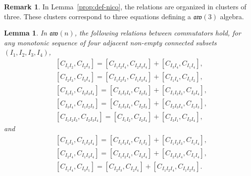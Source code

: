 \documentclass[10pt,a4paper]{amsart}
\numberwithin{equation}{section}
\newtheorem{lemm}[theo]{Lemma}
\theoremstyle{definition}
\newtheorem{rema}[theo]{Remark}
\newcommand{\aw}{\mathfrak{aw}(n)}
\begin{document}
\begin{rema}
In Lemma~\ref{prop:def-nico}, the relations are organized in clusters of three. These clusters correspond to three equations defining a $\mathfrak{aw}(3)$ algebra.
\end{rema}

\begin{lemm}\label{lem:relc1}
 In $\aw$, the following relations between commutators hold, for any monotonic sequence of four adjacent non-empty connected subsets $(I_1,I_2,I_3,I_4)$,
 \begin{align}
& [C_{I_1I_2},C_{I_2I_3} ]= [C_{I_1I_2I_4},C_{I_2I_3I_4} ]+ [C_{I_3I_4},C_{I_1I_4} ] ,
\label{eq:comut1}\\
& [C_{I_2I_3},C_{I_3I_4} ]= [C_{I_1I_2I_3},C_{I_1I_3I_4} ]+ [C_{I_1I_4},C_{I_1I_2} ] ,
\label{eq:comut2}\\
& [C_{I_1I_2} ,C_{I_2I_3I_4}]= [C_{I_1I_2I_4},C_{I_2I_3} ]+ [C_{I_1I_2I_3} ,C_{I_2I_4}] ,
\label{eq:comut3}\\
& [C_{I_3I_4} ,C_{I_1I_2I_3}]= [C_{I_1I_3I_4},C_{I_2I_3} ]+ [C_{I_2I_3I_4} ,C_{I_1I_3}] ,
\label{eq:comut4}\\
& [C_{I_1I_2I_3} ,C_{I_2I_3I_4}]= [C_{I_1I_2},C_{I_2I_4} ]+ [C_{I_3I_1} ,C_{I_3I_4}] ,
\label{eq:comut5}
 \end{align}
 and
 \begin{align}
& [C_{I_1I_3},C_{I_1I_2I_4} ]= [C_{I_1I_3I_4},C_{I_1I_2} ]+ [C_{I_1I_2I_3},C_{I_1I_4} ] ,
\label{eq:comut6}\\
& [C_{I_2I_4},C_{I_1I_3I_4} ]= [C_{I_1I_2I_4},C_{I_3I_4} ]+ [C_{I_2I_3I_4},C_{I_1I_4} ] ,
\label{eq:comut7}\\
& [C_{I_1I_4},C_{I_3I_1} ]= [C_{I_2I_3},C_{I_2I_4} ]+ [C_{I_1I_2I_4},C_{I_1I_2I_3} ] .
\label{eq:comut8}
 \end{align}
\end{lemm}
\end{document}
